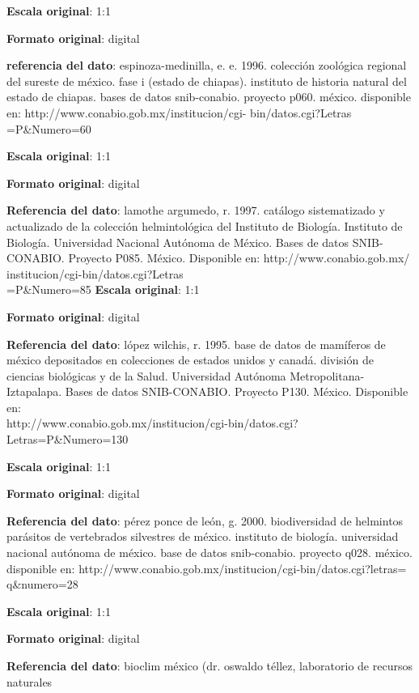 \documentclass[twoside]{book}
\begin{document}
{\textbf{Escala original}: 1:1

\textbf{Formato original}: digital

\textbf{referencia del dato}: espinoza-medinilla, e. e. 1996. colección zoológica regional del sureste de méxico. fase i (estado de chiapas). instituto de historia natural del estado de chiapas. bases de datos snib-conabio. proyecto p060. méxico. disponible en: http://www.conabio.gob.mx/institucion/cgi-
bin/datos.cgi?Letras\\=P\&Numero=60

\textbf{Escala original}: 1:1

\textbf{Formato original}: digital

\textbf{Referencia del dato}: lamothe argumedo, r. 1997. catálogo sistematizado y actualizado de la
colección helmintológica del Instituto de Biología. Instituto de Biología.
Universidad Nacional Autónoma de México. Bases de datos SNIB-CONABIO.
Proyecto P085. México. Disponible en:
http://www.conabio.gob.mx/\\institucion/cgi-bin/datos.cgi?Letras\\=P\&Numero=85
\textbf{Escala original}: 1:1

\textbf{Formato original}: digital

\textbf{Referencia del dato}: lópez wilchis, r. 1995. base de datos de mamíferos de méxico depositados en colecciones de estados unidos y canadá. división de ciencias biológicas y de la
Salud. Universidad Autónoma Metropolitana-Iztapalapa. Bases de datos SNIB-CONABIO. Proyecto P130. México. Disponible en: \\http://www.conabio.gob.mx/institucion/cgi-bin/datos.cgi?\\Letras=P\&Numero=130

\textbf{Escala original}: 1:1

\textbf{Formato original}: digital

\textbf{Referencia del dato}: pérez ponce de león, g. 2000. biodiversidad de helmintos parásitos de vertebrados silvestres de méxico. instituto de biología. universidad nacional autónoma de méxico. base de datos snib-conabio. proyecto q028. méxico. disponible en: http://www.conabio.gob.mx/institucion/cgi-bin/datos.cgi?letras=\\q\&numero=28

\textbf{Escala original}: 1:1

\textbf{Formato original}: digital

\textbf{Referencia del dato}: bioclim méxico (dr. oswaldo téllez, laboratorio de recursos naturales

}
\end{document}
